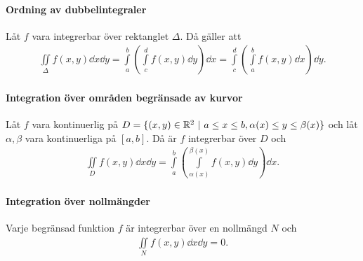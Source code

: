 \proof

\paragraph{Ordning av dubbelintegraler}
Låt $f$ vara integrerbar över rektanglet $\Delta$. Då gäller att
\begin{align*}
	\iint\limits_{\Delta}f(x, y)\dd{x}\dd{y} = \int\limits_{a}^{b}\left(\int\limits_{c}^{d}f(x, y)\dd{y}\right)\dd{x} = \int\limits_{c}^{d}\left(\int\limits_{a}^{b}f(x, y)\dd{x}\right)\dd{y}.
\end{align*}

\proof

\paragraph{Integration över områden begränsade av kurvor}
Låt $f$ vara kontinuerlig på $D = \{(x, y)\in\R^2\ |\ a\leq x\leq b, \alpha(x)\leq y\leq\beta(x)\}$ och låt $\alpha, \beta$ vara kontinuerliga på $[a, b]$. Då är $f$ integrerbar över $D$ och
\begin{align*}
	\iint\limits_{D}f(x, y)\dd{x}\dd{y} = \int\limits_{a}^{b}\left(\int\limits_{\alpha(x)}^{\beta(x)}f(x, y)\dd{y}\right)\dd{x}.
\end{align*}

\proof

\paragraph{Integration över nollmängder}
Varje begränsad funktion $f$ är integrerbar över en nollmängd $N$ och
\begin{align*}
	\iint\limits_{N}f(x, y)\dd{x}\dd{y} = 0.
\end{align*}

